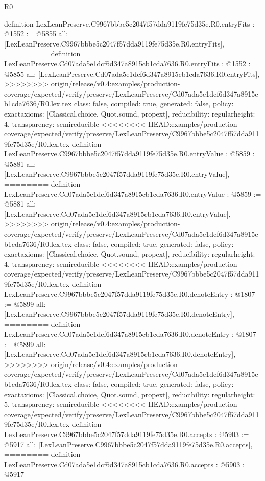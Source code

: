 \begin{lexlean}{R0}
\begin{coremodule}
{{{{{{{{{{{{{{{{{{{{{{{{{{{{{{{{{{{{{{{{{{{{{{{{{{{{{{{{{{{{{{{{{{{{{{{{{{{{{{{{{{{{{{{{{{{{{{{{{{definition LexLeanPreserve.C9967bbbe5c2047f57dda9119fe75d35e.R0.entryFits : @1552 := @5855 {
  all: [LexLeanPreserve.C9967bbbe5c2047f57dda9119fe75d35e.R0.entryFits],
========
definition LexLeanPreserve.Cd07ada5e1dcf6d347a8915cb1cda7636.R0.entryFits : @1552 := @5855 {
  all: [LexLeanPreserve.Cd07ada5e1dcf6d347a8915cb1cda7636.R0.entryFits],
>>>>>>>> origin/release/v0.4:examples/production-coverage/expected/verify/preserve/LexLeanPreserve/Cd07ada5e1dcf6d347a8915cb1cda7636/R0.lex.tex
  class: false,
  compiled: true,
  generated: false,
  policy: exact{axioms: [Classical.choice, Quot.sound, propext]},
  reducibility: regular{height: 4},
  transparency: semireducible
}
<<<<<<<< HEAD:examples/production-coverage/expected/verify/preserve/LexLeanPreserve/C9967bbbe5c2047f57dda9119fe75d35e/R0.lex.tex
definition LexLeanPreserve.C9967bbbe5c2047f57dda9119fe75d35e.R0.entryValue : @5859 := @5881 {
  all: [LexLeanPreserve.C9967bbbe5c2047f57dda9119fe75d35e.R0.entryValue],
========
definition LexLeanPreserve.Cd07ada5e1dcf6d347a8915cb1cda7636.R0.entryValue : @5859 := @5881 {
  all: [LexLeanPreserve.Cd07ada5e1dcf6d347a8915cb1cda7636.R0.entryValue],
>>>>>>>> origin/release/v0.4:examples/production-coverage/expected/verify/preserve/LexLeanPreserve/Cd07ada5e1dcf6d347a8915cb1cda7636/R0.lex.tex
  class: false,
  compiled: true,
  generated: false,
  policy: exact{axioms: [Classical.choice, Quot.sound, propext]},
  reducibility: regular{height: 4},
  transparency: semireducible
}
<<<<<<<< HEAD:examples/production-coverage/expected/verify/preserve/LexLeanPreserve/C9967bbbe5c2047f57dda9119fe75d35e/R0.lex.tex
definition LexLeanPreserve.C9967bbbe5c2047f57dda9119fe75d35e.R0.denoteEntry : @1807 := @5899 {
  all: [LexLeanPreserve.C9967bbbe5c2047f57dda9119fe75d35e.R0.denoteEntry],
========
definition LexLeanPreserve.Cd07ada5e1dcf6d347a8915cb1cda7636.R0.denoteEntry : @1807 := @5899 {
  all: [LexLeanPreserve.Cd07ada5e1dcf6d347a8915cb1cda7636.R0.denoteEntry],
>>>>>>>> origin/release/v0.4:examples/production-coverage/expected/verify/preserve/LexLeanPreserve/Cd07ada5e1dcf6d347a8915cb1cda7636/R0.lex.tex
  class: false,
  compiled: true,
  generated: false,
  policy: exact{axioms: [Classical.choice, Quot.sound, propext]},
  reducibility: regular{height: 5},
  transparency: semireducible
}
<<<<<<<< HEAD:examples/production-coverage/expected/verify/preserve/LexLeanPreserve/C9967bbbe5c2047f57dda9119fe75d35e/R0.lex.tex
definition LexLeanPreserve.C9967bbbe5c2047f57dda9119fe75d35e.R0.accepts : @5903 := @5917 {
  all: [LexLeanPreserve.C9967bbbe5c2047f57dda9119fe75d35e.R0.accepts],
========
definition LexLeanPreserve.Cd07ada5e1dcf6d347a8915cb1cda7636.R0.accepts : @5903 := @5917 {
}}}}}}}}}}}}}}}}}}}}}}}}}}}}}}}}}}}}}}}}}}}}}}}}}}}}}}}}}}}}}}}}}}}}}}}}}}}}}}}}}}}}}}}}}}}}}}}}}}}}}}}
\end{coremodule}
\end{lexlean}
